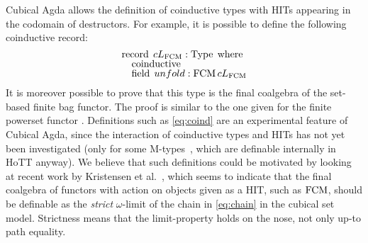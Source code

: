 \documentclass[final,a4paper,USenglish,cleveref]{lipics-v2021}
\begin{document}
Cubical Agda allows the definition of coinductive types with HITs appearing in the codomain of destructors. For example, it is possible to define the following coinductive record:
\begin{equation}\label{eq:coind}
\def\arraystretch{0.8}
\begin{array}{l}
\Op{record} \; \cLim{\FCM} :  \Type \;\Op{where} \\
\quad  \Op{coinductive} \\
 \quad \Op{field} \; \unfold : \FCM \cLim{\FCM}
\end{array}
\end{equation}
It is moreover possible to prove that this type is the final coalgebra of the set-based finite bag functor. The proof is similar to the one given for the finite powerset functor \cite[Theorem 2]{Veltri2021}. Definitions such as \eqref{eq:coind} are an experimental feature of Cubical Agda, since the interaction of coinductive types and HITs has not yet been investigated (only for some M-types~\cite{Vezzosi2019}, which are definable internally in HoTT anyway). We believe that such definitions could be motivated by looking at recent work by Kristensen et al.~\cite{Kristensen2022}, which seems to indicate that the final coalgebra of functors with action on objects given as a HIT, such as $\FCM$, should be definable as the \emph{strict} $\omega$-limit of the chain in \eqref{eq:chain} in the cubical set model. Strictness means that the limit-property holds on the nose, not only up-to path equality.



\end{document}
